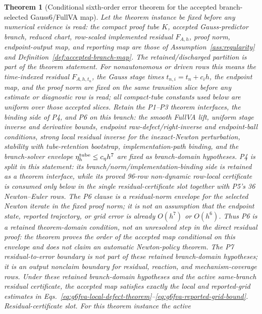 \documentclass[preprint,12pt]{elsarticle}
\newtheorem{theorem}{Theorem}
\newcommand{\method}{Gauss6\slash FullVA}
\begin{document}
\begin{theorem}[Conditional sixth-order error theorem for the accepted branch-selected \method{} map]
\label{thm:g6fullva-order}
Let the theorem instance be fixed before any numerical evidence is read: the compact
proof tube \(K\), accepted Gauss-predictor branch, reduced chart, row-scaled
implemented residual \(F_{A,h}\), proof norm, endpoint-output map, and
reporting map are those of Assumption~\ref{ass:regularity} and
Definition~\ref{def:accepted-branch-map}.  The retained/discharged partition
is part of the theorem statement.  For nonautonomous or driven rows this
means the time-indexed residual \(F_{A,h,t_n}\), the Gauss stage times
\(t_{n,i}=t_n+c_i h\), the endpoint map, and the proof norm are fixed on the
same transition slice before any estimate or diagnostic row is read; all
compact-tube constants used below are uniform over those accepted slices.
Retain the P1--P3 theorem interfaces, the
binding side of P4, and P6 on this branch: the smooth FullVA lift, uniform
stage inverse and derivative bounds, endpoint raw-defect/right-inverse and
endpoint-ball conditions, strong local residual inverse for the inexact-Newton
perturbation, stability with tube-retention bootstrap, implementation-path
binding, and the branch-solver envelope
\(\eta_h^{\rm tube}\le c_\eta h^7\) are fixed as branch-domain hypotheses.
P4 is split in this statement: its branch/norm/implementation-binding side is
retained as a theorem interface, while its proved 96-row non-dynamic
row-local certificate is consumed only below in the single residual-certificate
slot together with P5's 36 Newton--Euler rows.
The P6 clause is a residual-norm envelope for the selected Newton iterate in
the fixed proof norm; it is not an assumption that the endpoint state,
reported trajectory, or grid error is already \(O(h^7)\) or \(O(h^6)\).
Thus P6 is a retained theorem-domain condition, not an unresolved step in the
direct residual proof: the theorem proves the order of the accepted map
conditional on this envelope and does not claim an automatic Newton-policy
theorem.
The P7 residual-to-error boundary is not part of these retained
branch-domain hypotheses; it is an output nonclaim boundary for residual,
reaction, and mechanism-coverage rows.
Under these retained branch-domain hypotheses and the active same-branch
residual certificate, the accepted map satisfies exactly the local and
reported-grid estimates in
Eqs.~\eqref{eq:g6fva-local-defect-theorem}--\eqref{eq:g6fva-reported-grid-bound}.
\emph{Residual-certificate slot.}  For this theorem instance the active

\end{theorem}
\end{document}
